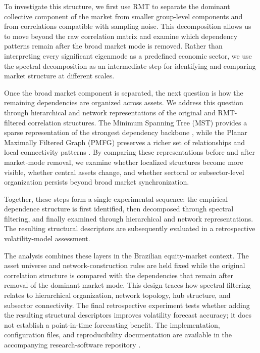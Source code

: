 To investigate this structure, we first use RMT to separate the dominant collective component of the market from smaller group-level components and from correlations compatible with sampling noise. This decomposition allows us to move beyond the raw correlation matrix and examine which dependency patterns remain after the broad market mode is removed. Rather than interpreting every significant eigenmode as a predefined economic sector, we use the spectral decomposition as an intermediate step for identifying and comparing market structure at different scales.

Once the broad market component is separated, the next question is how the remaining dependencies are organized across assets. We address this question through hierarchical and network representations of the original and RMT-filtered correlation structures. The Minimum Spanning Tree (MST) provides a sparse representation of the strongest dependency backbone \cite{mantegna_1999_hierarchical}, while the Planar Maximally Filtered Graph (PMFG) preserves a richer set of relationships and local connectivity patterns \cite{tumminello_2005_tool,tumminello_2010_correlation}. By comparing these representations before and after market-mode removal, we examine whether localized structures become more visible, whether central assets change, and whether sectoral or subsector-level organization persists beyond broad market synchronization.

Together, these steps form a single experimental sequence: the empirical dependence structure is first identified, then decomposed through spectral filtering, and finally examined through hierarchical and network representations. The resulting structural descriptors are subsequently evaluated in a retrospective volatility-model assessment.


The analysis combines these layers in the Brazilian equity-market context. The asset universe and network-construction rules are held fixed while the original correlation structure is compared with the dependencies that remain after removal of the dominant market mode. This design traces how spectral filtering relates to hierarchical organization, network topology, hub structure, and subsector connectivity. The final retrospective experiment tests whether adding the resulting structural descriptors improves volatility forecast accuracy; it does not establish a point-in-time forecasting benefit. The implementation, configuration files, and reproducibility documentation are available in the accompanying research-software repository \cite{rmt_planar_networks_2026}.

